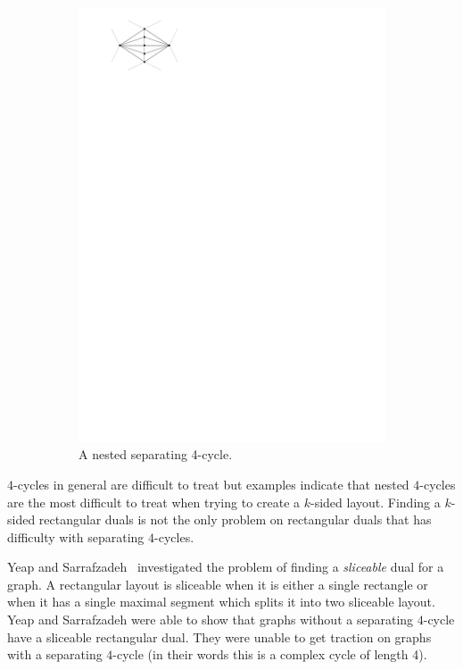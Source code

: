 \begin{figure}
\begin{subfigure}[t]{2cm}
          \includegraphics[width =\textwidth]{introduction/img/nest4cycle.pdf}
          \caption{A nested separating 4-cycle.}
      \end{subfigure}
    \caption{}
    \label{fig:intro:4cycle}
  \end{figure}


  $4$-cycles in general are difficult to treat but examples indicate that nested $4$-cycles are the most difficult to treat when trying to create a $k$-sided layout.
  Finding a $k$-sided rectangular duals is not the only problem on rectangular duals that has difficulty with separating $4$-cycles.

  Yeap and Sarrafzadeh~\cite{Yeap1995} investigated the problem of finding a \emph{sliceable} dual for a graph. A rectangular layout is sliceable when it is either a single rectangle or when it has a single maximal segment which splits it into two sliceable layout.
  Yeap and Sarrafzadeh were able to show that graphs without a separating $4$-cycle have a sliceable rectangular dual. They were unable to get traction on graphs with a separating $4$-cycle (in their words this is a complex cycle of length 4).

